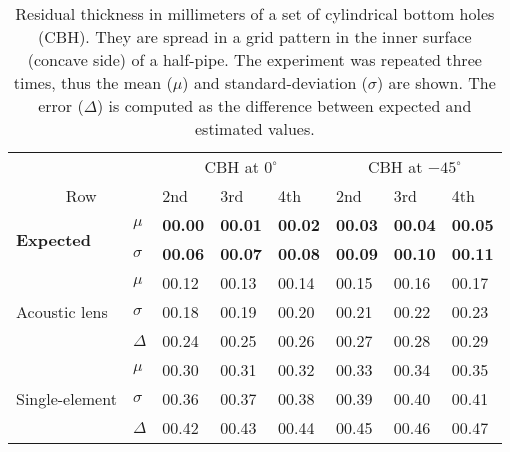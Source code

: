 \begin{table}[]
\label{tab:residual_thickness}
\centering
\caption{Residual thickness in millimeters of a set of cylindrical bottom holes (CBH). They are spread in a grid pattern in the inner surface (concave side) of a half-pipe. The experiment was repeated three times, thus the mean ($\mu$) and standard-deviation ($\sigma$) are shown. The error ($\Delta$) is computed as the difference between expected and estimated values.}
\begin{tabular}{ll|lll|lll}
                                   &                   & \multicolumn{3}{c|}{CBH at $0^\circ$}            & \multicolumn{3}{c}{CBH at $-45^\circ$}           \\
\multicolumn{2}{c|}{Row}                               & 2nd            & 3rd            & 4th            & 2nd            & 3rd            & 4th            \\ \hline
\multirow{2}{*}{\textbf{Expected}} & \textbf{$\mu$}    & \textbf{00.00} & \textbf{00.01} & \textbf{00.02} & \textbf{00.03} & \textbf{00.04} & \textbf{00.05} \\
                                   & \textbf{$\sigma$} & \textbf{00.06} & \textbf{00.07} & \textbf{00.08} & \textbf{00.09} & \textbf{00.10} & \textbf{00.11} \\ \hline
\multirow{3}{*}{Acoustic lens}     & $\mu$             & 00.12          & 00.13          & 00.14          & 00.15          & 00.16          & 00.17          \\
                                   & $\sigma$          & 00.18          & 00.19          & 00.20          & 00.21          & 00.22          & 00.23          \\
                                   & $\Delta$          & 00.24          & 00.25          & 00.26          & 00.27          & 00.28          & 00.29          \\ \hline
\multirow{3}{*}{Single-element}    & $\mu$             & 00.30          & 00.31          & 00.32          & 00.33          & 00.34          & 00.35          \\
                                   & $\sigma$          & 00.36          & 00.37          & 00.38          & 00.39          & 00.40          & 00.41          \\
                                   & $\Delta$          & 00.42          & 00.43          & 00.44          & 00.45          & 00.46          & 00.47
\end{tabular}
\end{table}